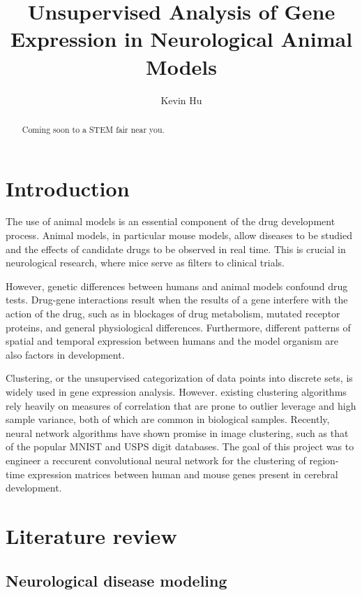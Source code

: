 \documentclass[12pt,oneside,onecolumn,a4paper]{article}
\title{Unsupervised Analysis of Gene Expression in Neurological Animal Models\vspace{-0.4cm}}
\author{Kevin Hu\vspace{-0.4cm}}
\affil{Massachusetts Academy of Math and Science\vspace{-0.4cm}}
\date{}
\begin{document}
\maketitle

\begin{abstract}
   Coming soon to a STEM fair near you.
\end{abstract}

\break
\tableofcontents
\break

\section{Introduction}

The use of animal models is an essential component of the drug development process. Animal models, in particular mouse models, allow diseases to be studied and the effects of candidate drugs to be observed in real time. This is crucial in neurological research, where mice serve as filters to clinical trials. 

However, genetic differences between humans and animal models confound drug tests. Drug-gene interactions result when the results of a gene interfere with the action of the drug, such as in blockages of drug metabolism, mutated receptor proteins, and general physiological differences. Furthermore, different patterns of spatial and temporal expression between humans and the model organism are also factors in development.

Clustering, or the unsupervised categorization of data points into discrete sets, is widely used in gene expression analysis. However. existing clustering algorithms rely heavily on measures of correlation that are prone to outlier leverage and high sample variance, both of which are common in biological samples. Recently, neural network algorithms have shown promise in image clustering, such as that of the popular MNIST and USPS digit databases. The goal of this project was to engineer a reccurent convolutional neural network for the clustering of region-time expression matrices between human and mouse genes present in cerebral development. 

\section{Literature review}

\subsection{Neurological disease modeling}\citep{Burns_2015}\citep{Lin_2014}
\end{document}
